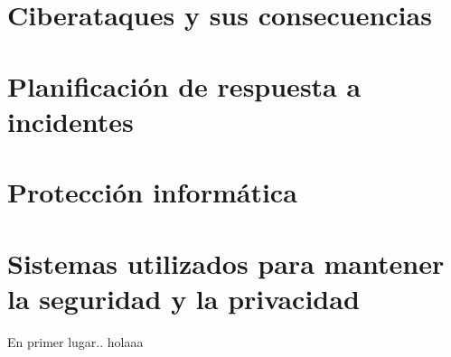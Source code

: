 \chapter{Ciberataques y sus consecuencias}
\label{cha:ciberataques-y-consecuencias}



\chapter{Planificación de respuesta a incidentes}
\label{cha:planificacion-de-respuesta}



\chapter{Protección informática}
\label{cha:proteccion-informatica}



\chapter{Sistemas utilizados para mantener la seguridad y la privacidad}
\label{cha:tipos-sistemas}

En primer lugar.\cite{rstudio}. holaaa










